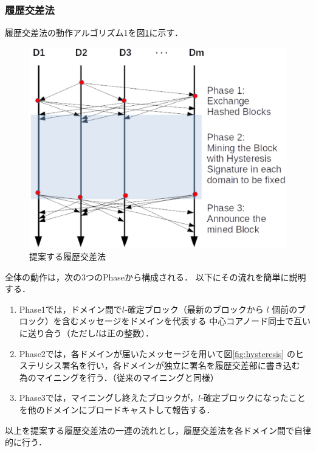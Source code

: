 \documentclass[a4paper,12pt]{jsarticle}
\begin{document}
\subsubsection{履歴交差法}
履歴交差法の動作アルゴリズム1を図\ref{fig:cross-ref}に示す．
%
\begin{figure}[H]%
  \begin{center}
    \includegraphics[width=120mm]{pht/time_sequence-algorithm1.eps}
  \end{center}
  \caption{提案する履歴交差法}
  \label{fig:cross-ref}
\end{figure}
%
全体の動作は，次の3つのPhaseから構成される．
以下にその流れを簡単に説明する．

\hspace{5mm}
%
\begin{enumerate}
    \item Phase1では，ドメイン間で$l$-確定ブロック（最新のブロックから 
          $l$ 個前のブロック）を含むメッセージをドメインを代表する
          中心コアノード同士で互いに送り合う（ただし$l$は正の整数）．

    \item Phase2では，各ドメインが届いたメッセージを用いて図\ref{fig:hysteresis}
          のヒステリシス署名を行い，各ドメインが独立に署名を履歴交差部に書き込む
          為のマイニングを行う．（従来のマイニングと同様）

    \item Phase3では，マイニングし終えたブロックが，$l$-確定ブロックになったこと
          を他のドメインにブロードキャストして報告する．
\end{enumerate}
%
\hspace{5mm}
以上を提案する履歴交差法の一連の流れとし，履歴交差法を各ドメイン間で自律的に行う．
\end{document}
